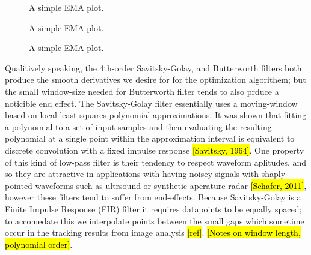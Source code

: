 \documentclass[10pt,a4paper]{article}
\begin{document}



\begin{figure}
    \centering
    
    \caption{A simple EMA plot.\label{fig:ema1}}
\end{figure}

\begin{figure}
    \centering
    
       \caption{A simple EMA plot.\label{fig:ema2}}
\end{figure}

\begin{figure}
    \centering
    
       \caption{A simple EMA plot.\label{fig:ema3}}
\end{figure}


Qualitively speaking, the 4th-order Savitsky-Golay, and Butterworth filters both produce the smooth derivatives we desire for for the optimization algorithem; but the small window-size needed for Butterworth filter tends to also prduce a noticible end effect. The Savitsky-Golay filter essentially uses a moving-window based on local least-squares polynomial approximations. It was shown that fitting a polynomial to a set of input samples and then evaluating the resulting polynomial at a single point within the approximation interval is equivalent to discrete convolution with a fixed impulse response \hl{[Savitsky, 1964]}. One property of this kind of low-pass filter is their tendency to respect waveform aplitudes, and so they are attractive in applications with having noisey signals with shaply pointed waveforms such as ultrsound or synthetic aperature radar \hl{[Schafer, 2011]}, however these filters tend to suffer from end-effects. Because Savitsky-Golay is a Finite Impulse Response (FIR) filter it requires datapoints to be equally spaced; to accomedate this we interpolate points between the small gaps which sometime occur in the tracking results from image analysis \hl{[ref]}. \hl{[Notes on window length, polynomial order]}.
\end{document}
